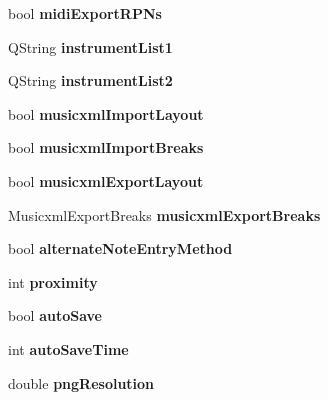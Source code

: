 \begin{DoxyCompactItemize}
bool {\bfseries midi\+Export\+R\+P\+Ns}
\item 
\mbox{\label{struct_ms_1_1_preferences_a09722eb3e25dbfeec9c36053547e663c}} 
Q\+String {\bfseries instrument\+List1}
\item 
\mbox{\label{struct_ms_1_1_preferences_aa722b6b5a0a0f3306f9f23890dee8ef8}} 
Q\+String {\bfseries instrument\+List2}
\item 
\mbox{\label{struct_ms_1_1_preferences_a782eec24a644508028aa1da99b0960fc}} 
bool {\bfseries musicxml\+Import\+Layout}
\item 
\mbox{\label{struct_ms_1_1_preferences_afb5de390059b66c21b33db05704527be}} 
bool {\bfseries musicxml\+Import\+Breaks}
\item 
\mbox{\label{struct_ms_1_1_preferences_ac15f0da274bb25dc26ab74867be9fd81}} 
bool {\bfseries musicxml\+Export\+Layout}
\item 
\mbox{\label{struct_ms_1_1_preferences_ae992fff366411e37d2f6fed22d52b662}} 
Musicxml\+Export\+Breaks {\bfseries musicxml\+Export\+Breaks}
\item 
\mbox{\label{struct_ms_1_1_preferences_ab380cfb0d1dce1eceeaa0dc708e49626}} 
bool {\bfseries alternate\+Note\+Entry\+Method}
\item 
\mbox{\label{struct_ms_1_1_preferences_ad90b5788ec449d8aaed5ce318072fc40}} 
int {\bfseries proximity}
\item 
\mbox{\label{struct_ms_1_1_preferences_a116cdb76bded79478fe8da9df2d38aa2}} 
bool {\bfseries auto\+Save}
\item 
\mbox{\label{struct_ms_1_1_preferences_a15eac6fd1ae70b9b7ce721e3810e6154}} 
int {\bfseries auto\+Save\+Time}
\item 
\mbox{\label{struct_ms_1_1_preferences_aab9089c3532a8dce8012e69bd41eed12}} 
double {\bfseries png\+Resolution}

\end{DoxyCompactItemize}
